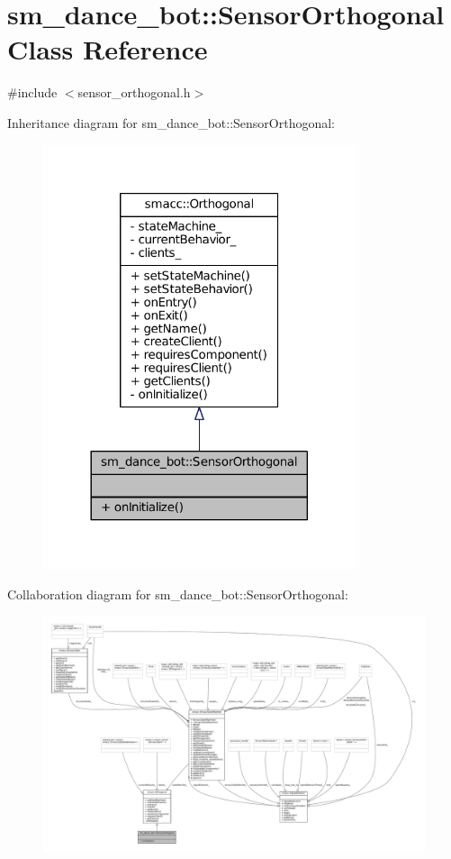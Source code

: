 \hypertarget{classsm__dance__bot_1_1SensorOrthogonal}{}\section{sm\+\_\+dance\+\_\+bot\+:\+:Sensor\+Orthogonal Class Reference}
\label{classsm__dance__bot_1_1SensorOrthogonal}


{\ttfamily \#include $<$sensor\+\_\+orthogonal.\+h$>$}



Inheritance diagram for sm\+\_\+dance\+\_\+bot\+:\+:Sensor\+Orthogonal\+:
\nopagebreak
\begin{figure}[H]
\begin{center}
\leavevmode
\includegraphics[width=260pt]{classsm__dance__bot_1_1SensorOrthogonal__inherit__graph}
\end{center}
\end{figure}


Collaboration diagram for sm\+\_\+dance\+\_\+bot\+:\+:Sensor\+Orthogonal\+:
\nopagebreak
\begin{figure}[H]
\begin{center}
\leavevmode
\includegraphics[width=350pt]{classsm__dance__bot_1_1SensorOrthogonal__coll__graph}
\end{center}
\end{figure}
